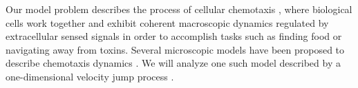 \documentclass[preprint]{elsarticle}
\begin{document}
%

%
%

Our model problem describes the process of cellular chemotaxis \cite{othmer2000diffusion}, where biological cells work together and exhibit coherent macroscopic dynamics regulated by extracellular sensed signals in order to accomplish tasks such as finding food or navigating away from toxins.
%
Several microscopic models have been proposed to describe chemotaxis dynamics \cite{othmer1988models, codling2008random}.
%
We will analyze one such model described by a one-dimensional velocity jump process \cite{othmer2000diffusion}.
%
%
%
%
%
%
%
%
%
\end{document}
